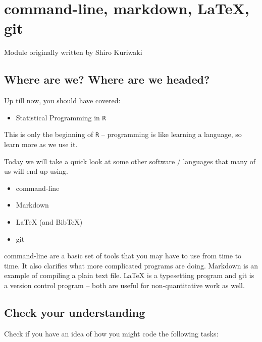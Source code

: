 \documentclass[]{book}
\providecommand{\tightlist}{%
  \setlength{\itemsep}{0pt}\setlength{\parskip}{0pt}}
\theoremstyle{definition}
\theoremstyle{definition}
\theoremstyle{definition}
\theoremstyle{remark}
\begin{document}
\chapter{command-line, markdown, LaTeX,
git}\label{command-line-markdown-latex-git}

Module originally written by Shiro Kuriwaki

\section{Where are we? Where are we
headed?}\label{where-are-we-where-are-we-headed-5}

Up till now, you should have covered:

\begin{itemize}
\tightlist
\item
  Statistical Programming in \texttt{R}
\end{itemize}

This is only the beginning of \texttt{R} -- programming is like learning
a language, so learn more as we use it.

Today we will take a quick look at some other software / languages that
many of us will end up using.

\begin{itemize}
\tightlist
\item
  command-line
\item
  Markdown
\item
  LaTeX (and BibTeX)
\item
  git
\end{itemize}

command-line are a basic set of tools that you may have to use from time
to time. It also clarifies what more complicated programs are doing.
Markdown is an example of compiling a plain text file. LaTeX is a
typesetting program and git is a version control program -- both are
useful for non-quantitative work as well.

\section{Check your understanding}\label{check-your-understanding-1}

Check if you have an idea of how you might code the following tasks:
\end{document}
